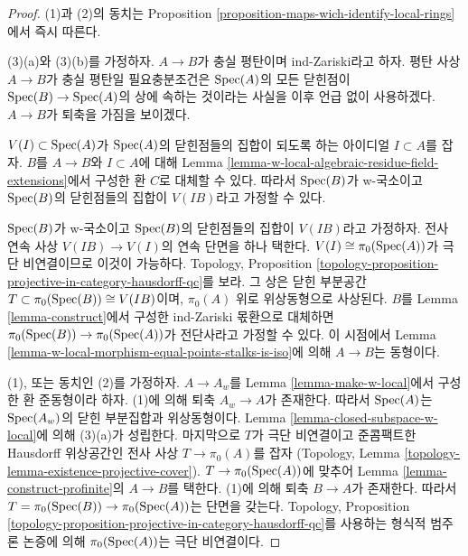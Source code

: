 \begin{proof}
(1)과 (2)의 동치는 Proposition
\ref{proposition-maps-wich-identify-local-rings}에서 즉시 따른다.

\medskip\noindent
(3)(a)와 (3)(b)를 가정하자. $A \to B$가 충실 평탄이며
ind-Zariski라고 하자. 평탄 사상 $A \to B$가 충실 평탄일 필요충분조건은
$\mathop{\mathrm{Spec}}(A)$의 모든 닫힌점이 $\mathop{\mathrm{Spec}}(B) \to \mathop{\mathrm{Spec}}(A)$의 상에 속하는
것이라는 사실을 이후 언급 없이 사용하겠다. $A \to B$가 퇴축을 가짐을
보이겠다.

\medskip\noindent
$V(I) \subset \mathop{\mathrm{Spec}}(A)$가 $\mathop{\mathrm{Spec}}(A)$의 닫힌점들의 집합이 되도록 하는
아이디얼 $I \subset A$를 잡자. $B$를 $A \to B$와 $I \subset A$에 대해
Lemma \ref{lemma-w-local-algebraic-residue-field-extensions}에서 구성한
환 $C$로 대체할 수 있다. 따라서 $\mathop{\mathrm{Spec}}(B)$가 w-국소이고
$\mathop{\mathrm{Spec}}(B)$의 닫힌점들의 집합이 $V(IB)$라고 가정할 수 있다.

\medskip\noindent
$\mathop{\mathrm{Spec}}(B)$가 w-국소이고 $\mathop{\mathrm{Spec}}(B)$의 닫힌점들의 집합이
$V(IB)$라고 가정하자.
전사 연속 사상 $V(IB) \to V(I)$의 연속 단면을 하나 택한다.
$V(I) \cong \pi_0(\mathop{\mathrm{Spec}}(A))$가 극단 비연결이므로 이것이 가능하다.
Topology, Proposition
\ref{topology-proposition-projective-in-category-hausdorff-qc}를 보라.
그 상은 닫힌 부분공간
$T \subset \pi_0(\mathop{\mathrm{Spec}}(B)) \cong V(IB)$이며,
$\pi_0(A)$ 위로 위상동형으로 사상된다.
$B$를 Lemma \ref{lemma-construct}에서 구성한 ind-Zariski 몫환으로
대체하면 $\pi_0(\mathop{\mathrm{Spec}}(B)) \to \pi_0(\mathop{\mathrm{Spec}}(A))$가 전단사라고
가정할 수 있다. 이 시점에서 Lemma
\ref{lemma-w-local-morphism-equal-points-stalks-is-iso}에 의해
$A \to B$는 동형이다.

\medskip\noindent
(1), 또는 동치인 (2)를 가정하자. $A \to A_w$를 Lemma
\ref{lemma-make-w-local}에서 구성한 환 준동형이라 하자.
(1)에 의해 퇴축 $A_w \to A$가 존재한다. 따라서 $\mathop{\mathrm{Spec}}(A)$는
$\mathop{\mathrm{Spec}}(A_w)$의 닫힌 부분집합과 위상동형이다. Lemma
\ref{lemma-closed-subspace-w-local}에 의해 (3)(a)가 성립한다.
마지막으로 $T$가 극단 비연결이고 준콤팩트한 Hausdorff 위상공간인
전사 사상 $T \to \pi_0(A)$를 잡자
(Topology, Lemma \ref{topology-lemma-existence-projective-cover}).
$T \to \pi_0(\mathop{\mathrm{Spec}}(A))$에 맞추어 Lemma
\ref{lemma-construct-profinite}의 $A \to B$를 택한다.
(1)에 의해 퇴축 $B \to A$가 존재한다. 따라서
$T = \pi_0(\mathop{\mathrm{Spec}}(B)) \to \pi_0(\mathop{\mathrm{Spec}}(A))$는 단면을 갖는다.
Topology, Proposition
\ref{topology-proposition-projective-in-category-hausdorff-qc}를 사용하는
형식적 범주론 논증에 의해 $\pi_0(\mathop{\mathrm{Spec}}(A))$는 극단 비연결이다.
\end{proof}

